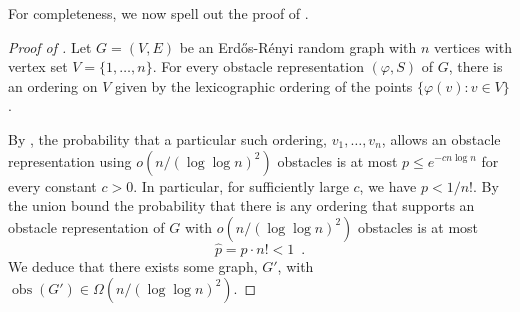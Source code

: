 \documentclass[12pt]{article}
\DeclareMathOperator{\obs}{obs}
\begin{document}
For completeness, we now spell out the proof of .

\begin{proof}[Proof of ]
  Let $G=(V,E)$ be an Erd\H{o}s-R\'enyi random graph with $n$ vertices
  with vertex set $V=\{1,\ldots,n\}$.  For every obstacle representation
  $(\varphi, S)$ of $G$, there is an ordering on $V$ given by the
  lexicographic ordering of the points $\{\varphi(v): v\in V\}$.

  By , the probability that a particular such ordering,
  $v_1,\ldots,v_n$, allows an obstacle representation using $o(n/(\log\log
  n)^2)$ obstacles is at most $p\le e^{-cn\log n}$ for every constant
  $c>0$. In particular, for sufficiently large $c$, we have $p < 1/n!$.  By the
  union bound the probability that there is any ordering that supports
  an obstacle representation of $G$ with $o(n/(\log\log n)^2)$ obstacles
  is at most
  \[
     \hat p = p\cdot n! < 1 \enspace .
  \]
  We deduce that there exists some graph, $G'$, with $\obs(G')\in
  \Omega(n/(\log\log n)^2)$.
\end{proof}
\end{document}
